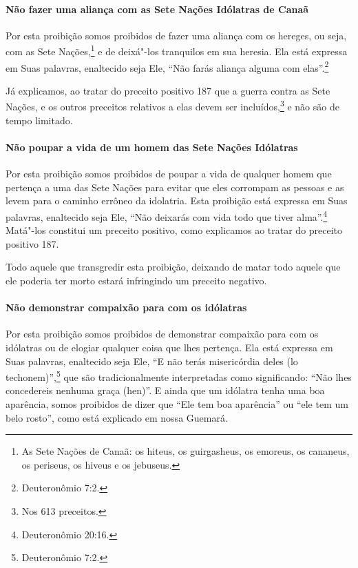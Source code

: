 \begin{multicols}{2}
\paragraph{Não fazer uma aliança com as Sete Nações Idólatras de Canaã}

Por esta proibição somos proibidos de fazer uma aliança com os hereges,
ou seja, com as Sete Nações,\footnote{As Sete Nações de Canaã: os hiteus, os guirgasheus, os emoreus, os cananeus, os periseus, os hiveus e os jebuseus.} e de deixá"-los tranquilos em sua heresia. Ela está expressa em Suas palavras,
enaltecido seja Ele, ``Não farás aliança alguma com elas''.\footnote{Deuteronômio
7:2.}

Já explicamos, ao tratar do preceito positivo 187 que a guerra contra as Sete Nações, e os outros preceitos relativos a elas devem ser
incluídos,\footnote{Nos 613 preceitos.} e não são de tempo limitado.

\paragraph{Não poupar a vida de um homem das Sete Nações Idólatras}

Por esta proibição somos proibidos de poupar a vida de qualquer homem
que pertença a uma das Sete Nações para evitar que eles corrompam as
pessoas e as levem para o caminho errôneo da idolatria. Esta proibição
está expressa em Suas palavras, enaltecido seja Ele, ``Não deixarás com
vida todo que tiver alma''.\footnote{Deuteronômio 20:16.} Matá"-los constitui um
preceito positivo, como explicamos ao tratar do preceito positivo 187.

Todo aquele que transgredir esta proibição, deixando de matar todo
aquele que ele poderia ter morto estará infringindo um preceito
negativo.

\paragraph{Não demonstrar compaixão para com os idólatras}

Por esta proibição somos proibidos de demonstrar compaixão para com os
idólatras ou de elogiar qualquer coisa que lhes pertença. Ela está
expressa em Suas palavras, enaltecido seja Ele, ``E não terás
misericórdia deles (lo techonem\starr)'',\footnote{Deuteronômio 7:2.} que são
tradicionalmente interpretadas como significando: ``Não lhes
concedereis nenhuma graça (hen)''. E ainda que um idólatra tenha uma boa
aparência, somos proibidos de dizer que ``Ele tem boa aparência'' ou
``ele tem um belo rosto'', como está explicado em nossa Guemará\starr.


\end{multicols}
